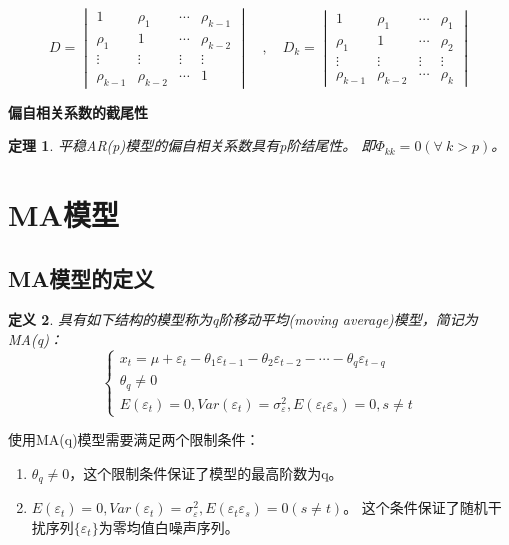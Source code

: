 \documentclass[12pt, a4paper, oneside]{ctexbook}
\newtheorem{theorem}{定理}[section]
\newtheorem{definition}[theorem]{定义}
\begin{document}
\begin{equation*}
    D=\begin{vmatrix}
        1          & \rho_1     & \cdots & \rho_{k-1} \\
        \rho_1     & 1          & \cdots & \rho_{k-2} \\
        \vdots     & \vdots     & \vdots & \vdots     \\
        \rho_{k-1} & \rho_{k-2} & \cdots & 1
    \end{vmatrix}\quad,\quad D_k=
    \begin{vmatrix}1          & \rho_1     & \cdots & \rho_1 \\
               \rho_1     & 1          & \cdots & \rho_2 \\
               \vdots     & \vdots     & \vdots & \vdots \\
               \rho_{k-1} & \rho_{k-2} & \cdots & \rho_k
    \end{vmatrix}
\end{equation*}

\textbf{偏自相关系数的截尾性}

\begin{theorem}
    平稳AR(p)模型的偏自相关系数具有p阶结尾性。
    即$\varPhi_{kk} = 0(\forall ~ k > p)$。
\end{theorem}

\section{MA模型}
\subsection{MA模型的定义}
\begin{definition}
    具有如下结构的模型称为q阶移动平均(moving average)模型，简记为MA(q)：
    \begin{equation}\label{eq3.18}
        \begin{cases}
            x_t=\mu+\varepsilon_t-\theta_1\varepsilon_{t-1}-\theta_2\varepsilon_{t-2}-\cdots-\theta_q\varepsilon_{t-q} \\
            \theta_q\neq0                                                                                              \\
            E(\varepsilon_t)=0,Var(\varepsilon_t)=\sigma_\varepsilon^2,E(\varepsilon_t\varepsilon_s)=0,s\neq t
        \end{cases}
    \end{equation}
\end{definition}
使用MA(q)模型需要满足两个限制条件：
\begin{enumerate}[1、]
    \item $\theta_q \neq 0$，这个限制条件保证了模型的最高阶数为q。
    \item $E(\varepsilon_t)=0,Var(\varepsilon_t)=\sigma_\varepsilon^2,E(\varepsilon_t\varepsilon_s)=0(s\neq t)$。
          这个条件保证了随机干扰序列$\{\varepsilon_t\}$为零均值白噪声序列。
\end{enumerate}
\end{document}
